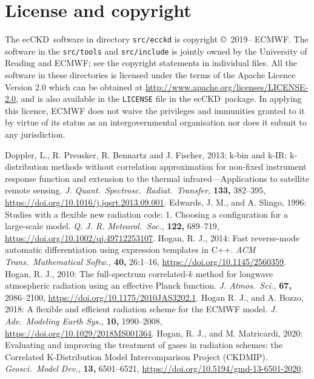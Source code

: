 \documentclass[a4,oneside]{article}
\def\codesize{\small}
\newcommand{\ecckd}{ecCKD}
\def\codesize{\small}
\def\code#1{{\codesize\texttt{#1}}}
\begin{document}
\section{License and copyright}
\label{sec:license}
The \ecckd\ software in directory \code{src/ecckd} is copyright
\copyright\ 2019-- ECMWF. The software in the \code{src/tools} and
\code{src/include} is jointly owned by the University of Reading and
ECMWF; see the copyright statements in individual files. All the
software in these directories is licensed under the terms of the
Apache Licence Version 2.0 which can be obtained at
\url{http://www.apache.org/licenses/LICENSE-2.0}, and is also
available in the \code{LICENSE} file in the \ecckd\ package.  In
applying this licence, ECMWF does not waive the privileges and
immunities granted to it by virtue of its status as an
intergovernmental organisation nor does it submit to any jurisdiction.

\begin{thebibliography}{00}
%    
Doppler, L.,
  R. Preusker, R. Bennartz and J. Fischer, 2013: {k-bin} and {k-IR}:
  k-distribution methods without correlation approximation for
  non-fixed instrument response function and extension to the thermal
  infrared---Applications to satellite remote
  sensing. \textit{J. Quant.\ Spectrosc.\ Radiat.\ Transfer,}
  \textbf{133,} 382--395,
  \url{https://doi.org/10.1016/j.jqsrt.2013.09.001}.
%
Edwards, J. M., and
  A. Slingo, 1996: Studies with a flexible new radiation code: 1.
  Choosing a configuration for a large-scale
  model. \textit{Q. J. R. Meteorol.\ Soc.,} \textbf{122,} 689--719,
  \url{https://doi.org/10.1002/qj.49712253107}.
%
Hogan, R. J., 2014: Fast
  reverse-mode automatic differentiation using expression templates in
  C++.  \textit{ACM Trans.\ Mathematical Softw.,} \textbf{40,}
  26:1--16, \url{https://doi.org/10.1145/2560359}.
%
Hogan, R. J., 2010: The
  full-spectrum correlated-$k$ method for longwave atmospheric
  radiation using an effective Planck
  function. \textit{J. Atmos.\ Sci.,} \textbf{67,} 2086--2100,
  \url{https://doi.org/10.1175/2010JAS3202.1}.
%
Hogan R. J., and
  A. Bozzo, 2018: A flexible and efficient radiation scheme for the
  ECMWF model. \emph{J. Adv.\ Modeling Earth Sys.,} \textbf{10,}
  1990--2008, \url{https://doi.org/10.1029/2018MS001364}.
%
Hogan, R. J., and
  M. Matricardi, 2020: Evaluating and improving the treatment of gases
  in radiation schemes: the Correlated K-Distribution Model
  Intercomparison Project (CKDMIP). \textit{Geosci.\ Model Dev.,}
  \textbf{13,} {6501--6521,}
  \url{https://doi.org/10.5194/gmd-13-6501-2020}.
%
\end{thebibliography}
\end{document}
